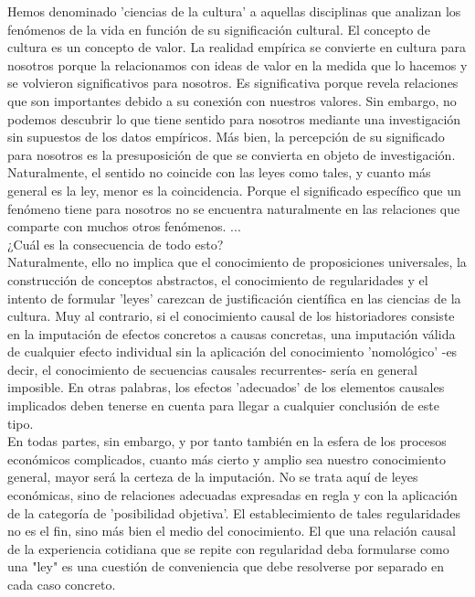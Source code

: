 Hemos denominado 'ciencias de la cultura' a aquellas disciplinas que analizan los fenómenos de la vida en función de su significación cultural. El concepto de cultura es un concepto de valor. La realidad empírica se convierte en cultura para nosotros porque la relacionamos con ideas de valor en la medida que lo hacemos y se volvieron significativos para nosotros. Es significativa porque revela relaciones que son importantes debido a su conexión con nuestros valores. Sin embargo, no podemos descubrir lo que tiene sentido para nosotros mediante una investigación sin supuestos de los datos empíricos. Más bien, la percepción de su significado para nosotros es la presuposición de que se convierta en objeto de investigación. Naturalmente, el sentido no coincide con las leyes como tales, y cuanto más general es la ley, menor es la coincidencia. Porque el significado específico que un fenómeno tiene para nosotros no se encuentra naturalmente en las relaciones que comparte con muchos otros fenómenos. ...\\

¿Cuál es la consecuencia de todo esto?\\
Naturalmente, ello no implica que el conocimiento de proposiciones universales, la construcción de conceptos abstractos, el conocimiento de regularidades y el intento de formular 'leyes' carezcan de justificación científica en las ciencias de la cultura. Muy al contrario, si el conocimiento causal de los historiadores consiste en la imputación de efectos concretos a causas concretas, una imputación válida de cualquier efecto individual sin la aplicación del conocimiento 'nomológico' -es decir, el conocimiento de secuencias causales recurrentes- sería en general imposible. En otras palabras, los efectos 'adecuados' de los elementos causales implicados deben tenerse en cuenta para llegar a cualquier conclusión de este tipo. \\
En todas partes, sin embargo, y por tanto también en la esfera de los procesos económicos complicados, cuanto más cierto y amplio sea nuestro conocimiento general, mayor será la certeza de la imputación. No se trata  aquí de leyes económicas, sino de relaciones adecuadas expresadas en regla y con la aplicación de la categoría de 'posibilidad objetiva'. El establecimiento de tales regularidades no es el fin, sino más bien el medio del conocimiento. El que una relación causal de la experiencia cotidiana que se repite con regularidad deba formularse como una "ley" es una cuestión de conveniencia que debe resolverse por separado en cada caso concreto. \\

